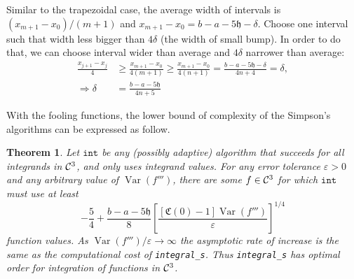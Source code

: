 \documentclass{iitthesis}
\DeclareMathOperator{\Var}{Var}
\newtheorem{theorem}{Theorem}
\theoremstyle{definition}
\theoremstyle{remark}
\begin{document}
Similar to the trapezoidal case, the average width of intervals is $(x_{m+1}-x_{0})/(m+1)$ and $x_{m+1}-x_{0}=b-a-5\mathfrak{h}-\delta$. Choose one interval such that width less bigger than $4\delta$ (the width of small bump). In order to do that, we can choose interval wider than average and $4\delta$ narrower than average:
  \begin{align*}
    \frac{x_{j+1}-x_{j}}{4}&\ge\frac{x_{m+1}-x_{0}}{4(m+1)}\ge\frac{x_{m+1}-x_{0}}{4(n+1)}=\frac{b-a-5\mathfrak{h}-\delta}{4n+4}=\delta,\\
    \Rightarrow \delta&=\frac{b-a-5\mathfrak{h}}{4n+5}
  \end{align*}

With the fooling functions, the lower bound of complexity of the Simpson's algorithms can be expressed as follow.
\begin{theorem}\label{compsim}
    Let $\texttt{int}$ be any (possibly adaptive) algorithm that succeeds for all integrands in $\mathcal{C}^3$, and only uses integrand values. For any error tolerance $\varepsilon > 0$ and any arbitrary value of $\Var(f''')$, there are some $f\in \mathcal{C}^3$ for which $\texttt{int}$ must use at least
    \begin{equation}\label{complowbdsim}
        -\frac{5}{4}+\frac{b-a-5\mathfrak{h}}{8}\left[\frac{[\mathfrak{C}(0)-1]\Var( f''')}{\varepsilon}\right]^{1/4}
    \end{equation}
    function values. As $\Var(f''')/\varepsilon \rightarrow \infty$ the asymptotic rate of increase is the same as the computational cost of {\tt integral\_s}. Thus {\tt integral\_s} has optimal order for integration of functions in $\mathcal{C}^3$.
\end{theorem}
\end{document}
